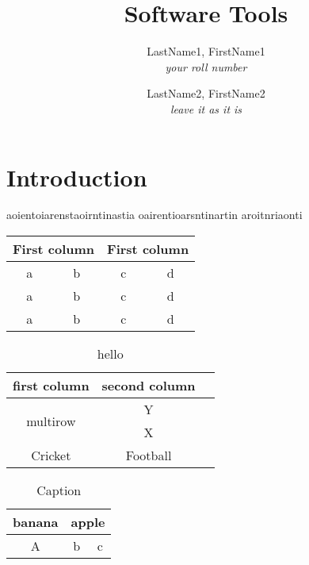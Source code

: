 \documentclass[12pt]{article}
\title{Software Tools}
\author{LastName1, FirstName1\\ \textit{your roll number}
\and LastName2, FirstName2\\ \textit{leave it as it is}}
\begin{document}
\maketitle

\section{Introduction}
aoientoiarenstaoirntinastia oairentioarsntinartin aroitnriaonti


\begin{table}
    \centering
    \begin{tabular}{|c|c|c|c|}
        \hline
        \multicolumn{2}{|c|}{First column} & \multicolumn{2}{|c|}{First column}         \\
        \hline
        a                                  & b                                  & c & d \\
        a                                  & b                                  & c & d \\
        a                                  & b                                  & c & d \\
        \hline
    \end{tabular}
\end{table}

\begin{table}
    \centering
    \caption{hello}
    \begin{tabular}{|c|c|c|}
        \hline
        first column              & second column \\
        \hline
        \multirow{2}{*}{multirow} & Y             \\
                                  & X             \\
        Cricket                   & Football      \\
        \hline
    \end{tabular}
    \label{nothing}
\end{table}

\begin{table}[]
    \centering
    \begin{tabular}{|c|c|c|}
        \hline
        banana & \multicolumn{2}{|c|}{apple}     \\
        \hline
        A      & b                           & c \\
        \hline
    \end{tabular}
    \caption{Caption}
    \label{tab:my_label}
\end{table}
\end{document}
